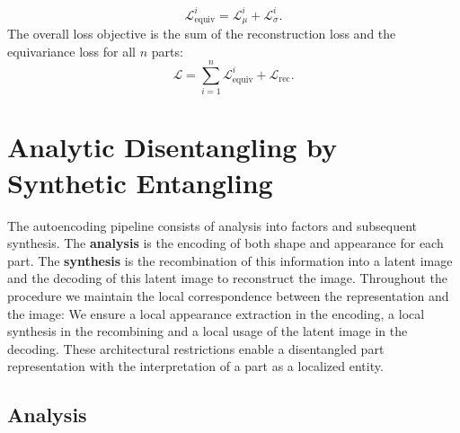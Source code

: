 	\begin{equation}
		\mathcal{L}_{\textrm{equiv}}^i = \mathcal{L}_{\mu}^i+ \mathcal{L}_{\sigma}^i.
	\label{covariance}
	\end{equation}
	The overall loss objective is the sum of the reconstruction loss and the equivariance loss for all $n$ parts:
	\begin{equation}
		\mathcal{L} = \sum_{i=1}^n \mathcal{L}_{\text{equiv}}^i + \mathcal{L}_{\textrm{rec}}.
	\end{equation}


\section{Analytic Disentangling by Synthetic Entangling}\label{sec:architecture}
	The autoencoding pipeline consists of analysis into factors and subsequent synthesis. The \textbf{analysis} is the {encoding} of both shape and appearance for each part. The \textbf{synthesis} is the {recombination} of this information into a latent image and the {decoding} of this latent image to reconstruct the image. %
	Throughout the procedure we maintain the local correspondence between the representation and the image: We ensure a local appearance extraction in the encoding, a local synthesis in the recombining and a local usage of the latent image in the decoding. These architectural restrictions enable a disentangled part representation with the interpretation of a part as a localized entity. \\

	\subsection{Analysis}

